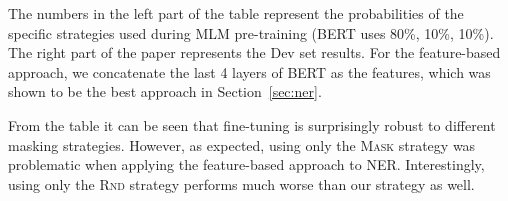 \documentclass[11pt,a4paper]{article}
\begin{document}
The numbers in the left part of the table represent the probabilities of the specific strategies used during MLM pre-training (BERT uses 80\%, 10\%, 10\%). The right part of the paper represents the Dev set results. For the feature-based
approach, we concatenate the last 4 layers of BERT as the features, which
was shown to be the best approach in Section~\ref{sec:ner}.

From the table it can be seen that fine-tuning is surprisingly robust to
different masking strategies. However, as expected, using only the \textsc{Mask} strategy
was problematic when applying the feature-based approach to NER. Interestingly,
using only the \textsc{Rnd} strategy performs much worse than our strategy as well.
\end{document}
